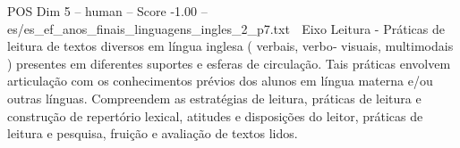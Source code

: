\begin{textsample}{POS Dim 5 – human – Score -1.00 – es/es\_ef\_anos\_finais\_linguagens\_ingles\_2\_p7.txt}  \label{ex:f5_pos_009}
 Eixo Leitura - Práticas de leitura de textos diversos em língua inglesa ( verbais, verbo‐ visuais, multimodais ) presentes em diferentes suportes e esferas de circulação.
Tais práticas envolvem articulação com os conhecimentos prévios dos alunos em língua materna e/ou outras línguas.
Compreendem as estratégias de leitura, práticas de leitura e construção de repertório lexical, atitudes e disposições do leitor, práticas de leitura e pesquisa, fruição e avaliação de textos lidos.

\end{textsample}
